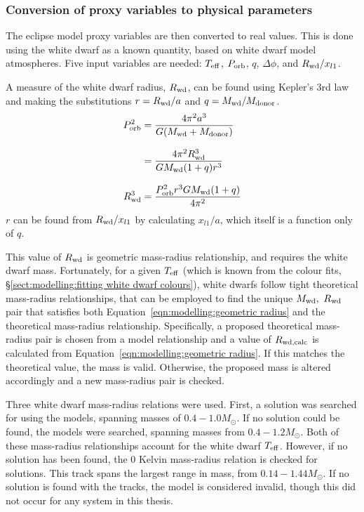 \subsubsection{Conversion of proxy variables to physical parameters}
\label{sect:modelling:conversion to physical parameters}
The eclipse model proxy variables are then converted to real values. This is done using the white dwarf as a known quantity, based on white dwarf model atmospheres. Five input variables are needed: $T_{\rm eff}$, $P_{\rm orb}$, $q$, $\Delta \phi$, and $R_{\rm wd} / x_{l1}$.


A measure of the white dwarf radius, $R_{\rm wd}$, can be found using Kepler's 3rd law and making the substitutions $r = R_{\rm wd} / a$ and $q = M_{\rm wd} / M_{\rm donor}$. 
\begin{align}
    P_{\rm orb}^2 &= \frac{4 \pi^2 a^3}{G (M_{\rm wd} + M_{\rm donor})} \\[8pt]
    &= \frac{4 \pi^2 R_{\rm wd}^3}{G M_{\rm wd} (1 + q) r^3} \\[8pt]
    R_{\rm wd}^3 &= \frac{P_{\rm orb}^2 r^3 G M_{\rm wd} (1 + q) }{4 \pi^2}
    \label{eqn:modelling:geometric radius}
\end{align}
$r$ can be found from $R_{\rm wd} / x_{l1}$ by calculating $x_{l1} / a$, which itself is a function only of $q$. 

This value of $R_{\rm wd}$ is geometric mass-radius relationship, and requires the white dwarf mass. Fortunately, for a given $T_{\rm eff}$ (which is known from the colour fits, \S\ref{sect:modelling:fitting white dwarf colours}), white dwarfs follow tight theoretical mass-radius relationships, that can be employed to find the unique $M_{\rm wd},\ R_{\rm wd}$ pair that satisfies both Equation~\ref{eqn:modelling:geometric radius} and the theoretical mass-radius relationship. 
Specifically, a proposed theoretical mass-radius pair is chosen from a model relationship and a value of $R_{\rm wd, calc}$ is calculated from Equation~\ref{eqn:modelling:geometric radius}. If this matches the theoretical value, the mass is valid. Otherwise, the proposed mass is altered accordingly and a new mass-radius pair is checked. 

Three white dwarf mass-radius relations were used. First, a solution was searched for using the \citet{wood1995} models, spanning masses of $0.4 - 1.0 M_\odot$. 
If no solution could be found, the \citet{panei2000} models were searched, spanning masses from $0.4 - 1.2 M_\odot$. 
Both of these mass-radius relationships account for the white dwarf $T_{\rm eff}$. However, if no solution has been found, the \citet{hamada1961} 0 Kelvin mass-radius relation is checked for solutions. This track spans the largest range in mass, from $0.14 - 1.44 M_\odot$. If no solution is found with the \citet{hamada1961} tracks, the model is considered invalid, though this did not occur for any system in this thesis.

